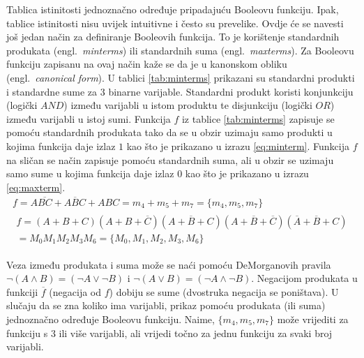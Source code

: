 \documentclass[times, utf8, diplomski]{fer}
\begin{document}
Tablica istinitosti jednoznačno određuje pripadajuću Booleovu funkciju. Ipak, tablice istinitosti nisu uvijek intuitivne i često su prevelike. Ovdje će se navesti još jedan način za definiranje Booleovih funkcija. To je korištenje standardnih produkata (engl.~\textit{minterms}) ili standardnih suma (engl.~\textit{maxterms}). Za Booleovu funkciju zapisanu na ovaj način kaže se da je u kanonskom obliku (engl.~\textit{canonical form}). U tablici \ref{tab:minterms} prikazani su standardni produkti i standardne sume za $3$ binarne varijable. Standardni produkt koristi konjunkciju (logički $AND$) između varijabli u istom produktu te disjunkciju (logički $OR$) između varijabli u istoj sumi. Funkcija $f$ iz tablice \ref{tab:minterms} zapisuje se pomoću standardnih produkata tako da se u obzir uzimaju samo produkti u kojima funkcija daje izlaz $1$ kao što je prikazano u izrazu \ref{eq:minterm}. Funkcija $f$ na sličan se način zapisuje pomoću standardnih suma, ali u obzir se uzimaju samo sume u kojima funkcija daje izlaz $0$ kao što je prikazano u izrazu \ref{eq:maxterm}.
%
\begin{gather}
	\label{eq:minterm}
	f=A\overline{BC}+A\overline{B}C+ABC=m_{4}+m_{5}+m_{7}=\{m_{4}, m_{5}, m_{7}\} \\
	\label{eq:maxterm}
	\begin{split}
		f=(A+B+C)(A+B+\overline{C})(A+\overline{B}+C)(A+\overline{B}+\overline{C})(\overline{A}+\overline{B}+C) \\
		=M_{0}M_{1}M_{2}M_{3}M_{6}=\{M_{0}, M_{1}, M_{2}, M_{3}, M_{6}\}
	\end{split}
\end{gather}

\noindent
Veza između produkata i suma može se naći pomoću DeMorganovih pravila $\neg (A \land B)=(\neg A \lor \neg B)$ i $\neg (A \lor B)=(\neg A \land \neg B)$. Negacijom produkata u funkciji $\overline{f}$ (negacija od $f$) dobiju se sume (dvostruka negacija se poništava). U slučaju da se zna koliko ima varijabli, prikaz pomoću produkata (ili suma) jednoznačno određuje Booleovu funkciju. Naime, $\{m_{4}, m_{5}, m_{7}\}$ može vrijediti za funkciju s $3$ ili više varijabli, ali vrijedi točno za jednu funkciju za svaki broj varijabli.
\end{document}

